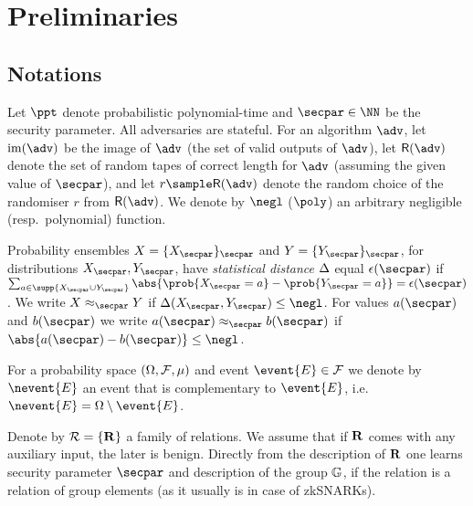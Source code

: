 \section{Preliminaries}
\label{sec:preliminaries}
\subsection{Notations} Let $\ppt$ denote probabilistic polynomial-time and $\secpar \in \NN$ be the
security parameter. All adversaries are stateful. For an algorithm $\adv$, let
$\image (\adv)$ be the image of $\adv$ (the set of valid outputs of $\adv$), let
$\RND{\adv}$ denote the set of random tapes of correct length for $\adv$
(assuming the given value of $\secpar$), and let $r \sample \RND{\adv}$ denote
the random choice of the randomiser $r$ from $\RND{\adv}$. We denote by $\negl$
($\poly$) an arbitrary negligible (resp.~polynomial) function.

Probability ensembles $X = \smallset{X_\secpar}_\secpar$ and $Y =
\smallset{Y_\secpar}_\secpar$, for distributions $X_\secpar, Y_\secpar$, have
\emph{statistical distance} $\Delta$ equal $\epsilon(\secpar)$ if $\sum_{a \in
  \supp{X_\secpar \cup Y_\secpar}} \abs{\prob{X_\secpar = a} - \prob{Y_\secpar =
    a}} = \epsilon(\secpar)$. We write $X \approx_\secpar Y$ if $\SD(X_\secpar,
Y_\secpar) \leq \negl$. For values $a(\secpar)$ and $b(\secpar)$ we write
$a(\secpar) \approx_\secpar b(\secpar)$ if $\abs{a(\secpar) - b(\secpar)} \leq
\negl$.

For a probability space $(\Omega, \mathcal{F}, \mu)$ and event
$\event{E} \in \eventspace$ we denote by $\nevent{E}$ an event that is
complementary to $\event{E}$,
i.e.~$\nevent{E} = \samplespace \setminus \event{E}$.

Denote by $\mathcal{R} = \{\mathbf{R}\}$ a family of relations. We assume that if
$\mathbf{R}$ comes with any auxiliary input, the later is benign. Directly from the
description of $\mathbf{R}$ one learns security parameter $\secpar$ and description of the
group $\mathbb{G}$, if the relation is a relation of group elements (as it usually is
in case of zkSNARKs).

